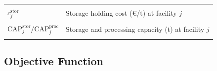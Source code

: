 \documentclass[preprint,review,1p,authoryear]{elsarticle} %
\newcommand{\euro}{€}
\begin{document}
\begin{table}[!h]
{\begin{tabular}[t]{>{\raggedright\arraybackslash}p{5cm}>{\raggedright\arraybackslash}p{9cm}}
\hspace{1em}\cellcolor{gray!10}{$c^{\text{tr-pre}}$} & \cellcolor{gray!10}{Transport cost rate (\euro/t\,km) for pre-treated biomass}\\
\hspace{1em}$c^{\text{stor}}_j$ & Storage holding cost (\euro/t) at facility $j$\\
\hspace{1em}\cellcolor{gray!10}{$d_{ij}$, $d_{jk}$} & \cellcolor{gray!10}{Distance (km) between nodes}\\
\hspace{1em}$\text{CAP}^{\text{stor}}_j/\text{CAP}^{\text{proc}}_j$ & Storage and processing capacity (t) at facility $j$\\
\hspace{1em}\cellcolor{gray!10}{$D^{\max}_{kpt}$} & \cellcolor{gray!10}{Maximum demand (t) of fraction $p$ at consumer $k$ in period $t$}\\
\bottomrule
\end{tabular}}
\end{table}

\subsection{Objective Function}\label{objective-function}
\end{document}
